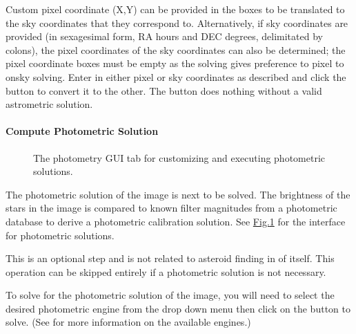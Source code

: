\documentclass[letterpaper,11pt,english]{sphinxmanual}
\begin{document}
\sphinxAtStartPar
Custom pixel coordinate (X,Y) can be provided in the boxes to be translated to
the sky coordinates that they correspond to. Alternatively, if sky coordinates
are provided (in sexagesimal form, RA hours and DEC degrees, delimitated by
colons), the pixel coordinates of the sky coordinates can also be determined;
the pixel coordinate boxes must be empty as the solving gives preference to
pixel to on\sphinxhyphen{}sky solving. Enter in either pixel or sky coordinates as described
and click the  button to convert it to the other. The
button does nothing without a valid astrometric solution.


\paragraph{Compute Photometric Solution}
\label{\detokenize{user/manual_mode:compute-photometric-solution}}\label{\detokenize{user/manual_mode:user-manual-mode-procedure-find-asteroid-location-compute-photometric-solution}}
\begin{figure}[htbp]
\centering
\capstart

\noindent{}
\caption{The photometry GUI tab for customizing and executing photometric solutions.}\label{\detokenize{user/manual_mode:id6}}\label{\detokenize{user/manual_mode:figure-manual-mode-gui-photometry}}\end{figure}

\sphinxAtStartPar
The photometric solution of the image is next to be solved. The brightness of
the stars in the image is compared to known filter magnitudes from a
photometric database to derive a photometric calibration solution.
See \hyperref[\detokenize{user/manual_mode:figure-manual-mode-gui-photometry}]{Fig.\@ \ref{\detokenize{user/manual_mode:figure-manual-mode-gui-photometry}}} for the interface for photometric
solutions.

\sphinxAtStartPar
This is an optional step and is not related to asteroid finding in of itself.
This operation can be skipped entirely if a photometric solution is not
necessary.

\sphinxAtStartPar
To solve for the photometric solution of the image, you will need to select
the desired photometric engine from the drop down menu then click on the
 button to solve.
(See {\hyperref[\detokenize{technical/architecture/services_engines:technical-architecture-services-engines}]{}} for more information on
the available engines.)
\end{document}
